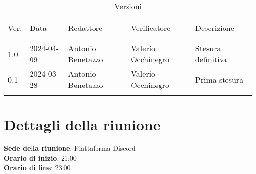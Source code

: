 \documentclass[italian,12pt]{article} %
\begin{document}


\newpage



\begin{table}[!h]
	\caption{Versioni}
	\footnotesize
	\begin{center}
		\begin{tabular}{ l l l l l }
			\hline                                                                                            \\[-2ex]
			Ver. & Data       & Redattore          & Verificatore       & Descrizione                         \\
			\\[-2ex] \hline \\[-1.5ex]
			1.0  & 2024-04-09 & Antonio Benetazzo  & Valerio Occhinegro & Stesura definitiva                  \\
			0.1  & 2024-03-28 & Antonio Benetazzo  & Valerio Occhinegro & Prima stesura                       \\
			\\[-1.5ex] \hline
		\end{tabular}
	\end{center}
\end{table}

\newpage

\tableofcontents

\newpage

\section{Dettagli della riunione}


\textbf{Sede della riunione}: Piattaforma Discord\\
\textbf{Orario di inizio}: 21:00\\
\textbf{Orario di fine}: 23:00\\
\end{document}
